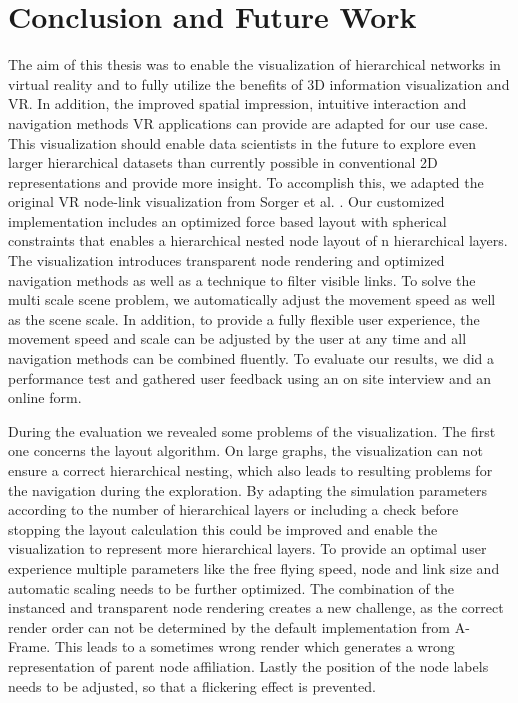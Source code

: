 \chapter{Conclusion and Future Work}
\label{chap:conclusion}

The aim of this thesis was to enable the visualization of hierarchical networks in virtual reality and to fully utilize the benefits of 3D information visualization and VR. In addition, the improved spatial impression, intuitive interaction and navigation methods VR applications can provide are adapted for our use case. 
This visualization should enable data scientists in the future to explore even larger hierarchical datasets than currently possible in conventional 2D representations and provide more insight.
To accomplish this, we adapted the original VR node-link visualization from Sorger et al. \cite{sorger_immersive_2019}. 
Our customized implementation includes an optimized force based layout with spherical constraints that enables a hierarchical nested node layout of n hierarchical layers.
The visualization introduces transparent node rendering and optimized navigation methods as well as a technique to filter visible links. 
To solve the multi scale scene problem, we automatically adjust the movement speed as well as the scene scale.
In addition, to provide a fully flexible user experience, the movement speed and scale can be adjusted by the user at any time and all navigation methods can be combined fluently.
To evaluate our results, we did a performance test and gathered user feedback using an on site interview and an online form.

During the evaluation we revealed some problems of the visualization. 
The first one concerns the layout algorithm. On large graphs, the visualization can not ensure a correct hierarchical nesting, which also leads to resulting problems for the navigation during the exploration. By adapting the simulation parameters according to the number of hierarchical layers or including a check before stopping the layout calculation this could be improved and enable the visualization to represent more hierarchical layers.
To provide an optimal user experience multiple parameters like the free flying speed, node and link size and automatic scaling needs to be further optimized.
The combination of the instanced and transparent node rendering creates a new challenge, as the correct render order can not be determined by the default implementation from A-Frame. This leads to a sometimes wrong render which generates a wrong representation of parent node affiliation.
Lastly the position of the node labels needs to be adjusted, so that a flickering effect is prevented.

